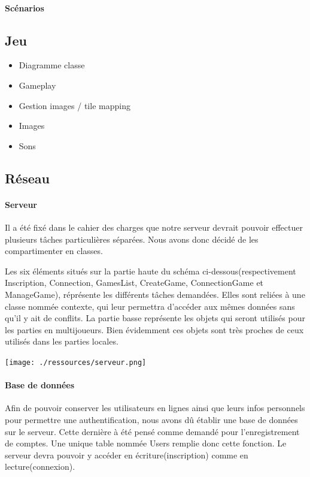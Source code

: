 \documentclass[]{report}
\begin{document}
				
				\paragraph{Scénarios}
			
		\subsection{Jeu}
			\begin{itemize}
				\item{Diagramme classe}
				\item{Gameplay}
				\item{Gestion images / tile mapping}
				\item{Images}
				\item{Sons}
			\end{itemize}
			
		\subsection{Réseau}
			\paragraph{Serveur\\}
			
			Il a été fixé dans le cahier des charges que notre serveur devrait pouvoir
			effectuer plusieurs tâches particulières séparées. Nous avons donc décidé de
			les compartimenter en classes.
			
			Les six éléments situés sur la partie haute du schéma
			ci-dessous(respectivement Inscription, Connection, GamesList, CreateGame,
			ConnectionGame et ManageGame), réprésente les différents tâches demandées.
			Elles sont reliées à une classe nommée contexte, qui leur permettra d'accéder
			aux mêmes données sans qu'il y ait de conflits. La partie basse représente les
			objets qui seront utilisés pour les parties en multijoueurs. Bien évidemment
			ces objets sont très proches de ceux utilisés dans les parties locales.
		
			\begin{center}
					\texttt{[image: ./ressources/serveur.png]}
			\end{center}
			
			
			\paragraph{Base de données\\}
			Afin de pouvoir conserver les utilisateurs en lignes ainsi que leurs infos
			personnels pour permettre une authentification, nous avons dû établir une
			base de données sur le serveur. Cette dernière à été pensé comme demandé pour 
			l'enregistrement de comptes. Une unique table nommée Users remplie donc cette
			fonction. Le serveur devra pouvoir y accéder en écriture(inscription) comme
			en lecture(connexion).
			
\end{document}

